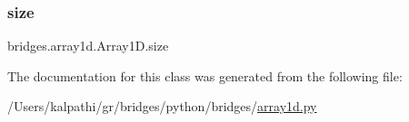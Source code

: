 \subsubsection{\texorpdfstring{size}{size}}
{\footnotesize\ttfamily bridges.\+array1d.\+Array1\+D.\+size}



The documentation for this class was generated from the following file\+:\begin{DoxyCompactItemize}
\item 
/\+Users/kalpathi/gr/bridges/python/bridges/\mbox{\hyperlink{array1d_8py}{array1d.\+py}}\end{DoxyCompactItemize}
